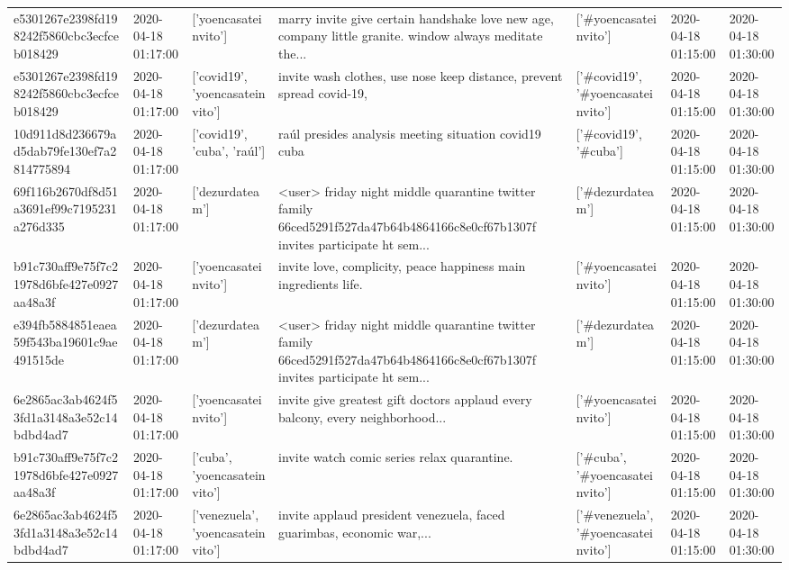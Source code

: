 \begin{tabular}{lllllll}
e5301267e2398fd198242f5860cbc3ecfceb018429 & 2020-04-18 01:17:00 & ['yoencasateinvito'] & marry invite give certain handshake love new age, company little granite. window always meditate the... & ['#yoencasateinvito'] & 2020-04-18 01:15:00 & 2020-04-18 01:30:00 \\
e5301267e2398fd198242f5860cbc3ecfceb018429 & 2020-04-18 01:17:00 & ['covid19', 'yoencasateinvito'] & invite wash clothes, use nose keep distance, prevent spread covid-19, & ['#covid19', '#yoencasateinvito'] & 2020-04-18 01:15:00 & 2020-04-18 01:30:00 \\
10d911d8d236679ad5dab79fe130ef7a2814775894 & 2020-04-18 01:17:00 & ['covid19', 'cuba', 'raúl'] & raúl presides analysis meeting situation covid19 cuba & ['#covid19', '#cuba'] & 2020-04-18 01:15:00 & 2020-04-18 01:30:00 \\
69f116b2670df8d51a3691ef99c7195231a276d335 & 2020-04-18 01:17:00 & ['dezurdateam'] & <user> friday night middle quarantine twitter family 66ced5291f527da47b64b4864166c8e0cf67b1307f invites participate ht sem... & ['#dezurdateam'] & 2020-04-18 01:15:00 & 2020-04-18 01:30:00 \\
b91c730aff9e75f7c21978d6bfe427e0927aa48a3f & 2020-04-18 01:17:00 & ['yoencasateinvito'] & invite love, complicity, peace happiness main ingredients life. & ['#yoencasateinvito'] & 2020-04-18 01:15:00 & 2020-04-18 01:30:00 \\
e394fb5884851eaea59f543ba19601c9ae491515de & 2020-04-18 01:17:00 & ['dezurdateam'] & <user> friday night middle quarantine twitter family 66ced5291f527da47b64b4864166c8e0cf67b1307f invites participate ht sem... & ['#dezurdateam'] & 2020-04-18 01:15:00 & 2020-04-18 01:30:00 \\
6e2865ac3ab4624f53fd1a3148a3e52c14bdbd4ad7 & 2020-04-18 01:17:00 & ['yoencasateinvito'] & invite give greatest gift doctors applaud every balcony, every neighborhood... & ['#yoencasateinvito'] & 2020-04-18 01:15:00 & 2020-04-18 01:30:00 \\
b91c730aff9e75f7c21978d6bfe427e0927aa48a3f & 2020-04-18 01:17:00 & ['cuba', 'yoencasateinvito'] & invite watch comic series relax quarantine. & ['#cuba', '#yoencasateinvito'] & 2020-04-18 01:15:00 & 2020-04-18 01:30:00 \\
6e2865ac3ab4624f53fd1a3148a3e52c14bdbd4ad7 & 2020-04-18 01:17:00 & ['venezuela', 'yoencasateinvito'] & invite applaud president venezuela, faced guarimbas, economic war,... & ['#venezuela', '#yoencasateinvito'] & 2020-04-18 01:15:00 & 2020-04-18 01:30:00 \\

\end{tabular}
